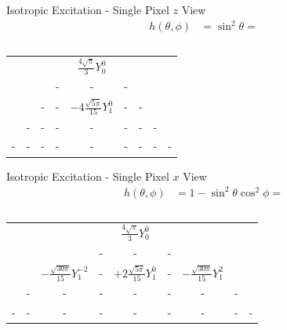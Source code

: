 \documentclass[presentation]{beamer}
\begin{document}
\begin{frame}[label=sec-5]{Isotropic Excitation - Single Pixel $z$ View}
\begin{align*}
h(\theta, \phi) &= \sin^2\theta = \\ \\
\end{align*}
\begin{center}
\begin{tabular}{ccccccccc} 
&&&&$\frac{4\sqrt{\pi}}{3}Y_0^0$&&&&\\
&&&-&-&-&&&\\
&&-&-&$-4\frac{\sqrt{5\pi}}{15}Y_1^0$&-&-&&\\
&-&-&-&-&-&-&-&\\
-&-&-&-&-&-&-&-&-\\
\end{tabular}
\end{center}
\end{frame}
\begin{frame}[label=sec-6]{Isotropic Excitation - Single Pixel $x$ View}
\begin{align*}
h(\theta, \phi) &= 1 - \sin^2\theta\cos^2\phi= \\ \\
\end{align*}
\begin{center}
\begin{tabular}{ccccccccc} 
&&&&$\frac{4\sqrt{\pi}}{3}Y_0^0$&&&&\\
&&&-&-&-&&&\\
&&$-\frac{\sqrt{30\pi}}{15}Y_1^{-2}$&-&$+2\frac{\sqrt{5\pi}}{15}Y_1^0$&-&$-\frac{\sqrt{30\pi}}{15}Y_1^2$&&\\
&-&-&-&-&-&-&-&\\
-&-&-&-&-&-&-&-&-\\
\end{tabular}
\end{center}
\end{frame}
\end{document}
